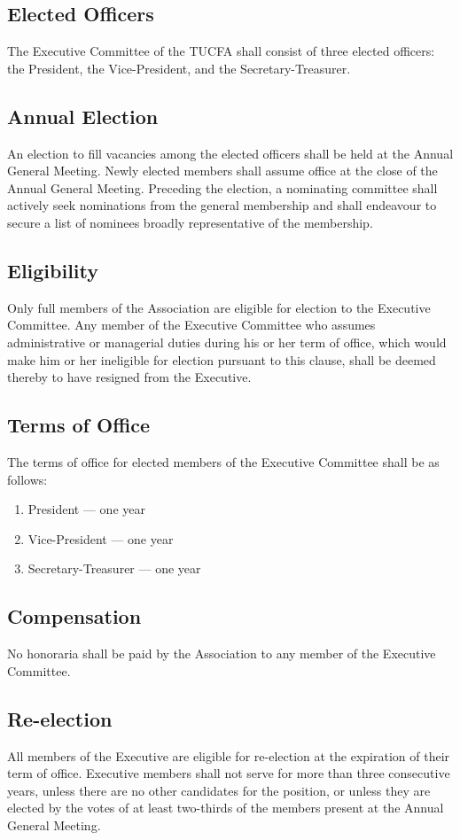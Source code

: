 \documentclass[12pt]{article}
\begin{document}
\subsection{Elected Officers}
The Executive Committee of the TUCFA shall consist of three elected officers: the President, the Vice-President, and the Secretary-Treasurer.

\subsection{Annual Election}
An election to fill vacancies among the elected officers shall be held at the Annual General Meeting. Newly elected members shall assume office at the close of the Annual General Meeting. Preceding the election, a nominating committee shall actively seek nominations from the general membership and shall endeavour to secure a list of nominees broadly representative of the membership.

\subsection{Eligibility}
Only full members of the Association are eligible for election to the Executive Committee. Any member of the Executive Committee who assumes administrative or managerial duties during his or her term of office, which would make him or her ineligible for election pursuant to this clause, shall be deemed thereby to have resigned from the Executive.

\subsection{Terms of Office}
The terms of office for elected members of the Executive Committee shall be as follows:

\begin{enumerate}
\item
President --- one year
\item
Vice-President --- one year
\item
Secretary-Treasurer --- one year
\end{enumerate}

\subsection{Compensation}
No honoraria shall be paid by the Association to any member of the Executive Committee.

\subsection{Re-election}
All members of the Executive are eligible for re-election at the expiration of their term of office. Executive members shall not serve for more than three consecutive years, unless there are no other candidates for the position, or unless they are elected by the votes of at least two-thirds of the members present at the Annual General Meeting.
\end{document}
